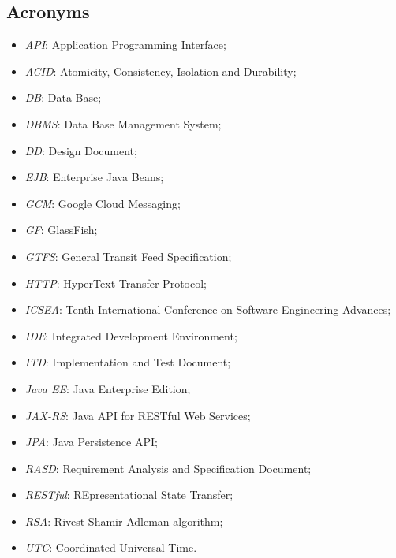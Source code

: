\subsection{Acronyms}
	\begin{itemize}
	\item \textit{API}: Application Programming Interface;
	\item \textit{ACID}: Atomicity, Consistency, Isolation and Durability;
	\item \textit{DB}: Data Base;
	\item \textit{DBMS}: Data Base Management System;
	\item \textit{DD}: Design Document;
	\item \textit{EJB}: Enterprise Java Beans;
	\item \textit{GCM}: Google Cloud Messaging;
	\item \textit{GF}: GlassFish;
	\item \textit{GTFS}: General Transit Feed Specification;
	\item \textit{HTTP}: HyperText Transfer Protocol;
	\item \textit{ICSEA}: Tenth International Conference on Software Engineering Advances;
	\item \textit{IDE}: Integrated Development Environment;
	\item \textit{ITD}: Implementation and Test Document;
	\item \textit{Java EE}: Java Enterprise Edition;
	\item \textit{JAX-RS}: Java API for RESTful Web Services;
	\item \textit{JPA}: Java Persistence API;
	\item \textit{RASD}: Requirement Analysis and Specification Document;
	\item \textit{RESTful}: REpresentational State Transfer;
	\item \textit{RSA}: Rivest-Shamir-Adleman algorithm;
	\item \textit{UTC}: Coordinated Universal Time.
	\end{itemize}